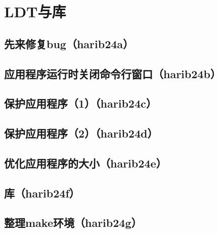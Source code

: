 ﻿\chapter{	LDT与库	}
\section{	先来修复bug（harib24a）	}
\section{	应用程序运行时关闭命令行窗口（harib24b）	}
\section{	保护应用程序（1）（harib24c）	}
\section{	保护应用程序（2）（harib24d）	}
\section{	优化应用程序的大小（harib24e）	}
\section{	库（harib24f）	}
\section{	整理make环境（harib24g）	}

